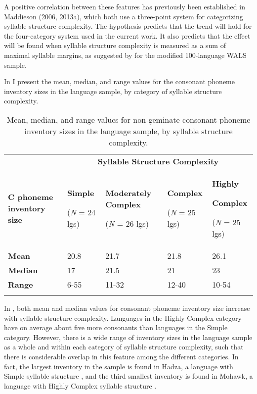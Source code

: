   A positive correlation between these features has previously been established in Maddieson (2006, 2013a), which both use a three-point system for categorizing syllable structure complexity. The hypothesis predicts that the trend will hold for the four-category system used in the current work. It also predicts that the effect will be found when syllable structure complexity is measured as a sum of maximal syllable margins, as suggested by \citet{Gordon2016} for the modified 100-language WALS sample.

  In  I present the mean, median, and range values for the consonant phoneme inventory sizes in the language sample, by category of syllable structure complexity. 

\begin{table}
\begin{tabularx}{\textwidth}{XXXXX}
 & \multicolumn{4}{c}{ \textbf{Syllable Structure Complexity}}\\
\lsptoprule
\textbf{C phoneme inventory size} & { \textbf{Simple}}

 (\textit{N} = 24 lgs) & { \textbf{Moderately Complex}}

 (\textit{N} = 26 lgs) & { \textbf{Complex}}

 (\textit{N} = 25 lgs) & { \textbf{Highly} }

{ \textbf{Complex}}

 (\textit{N} = 25 lgs)\\
\textbf{Mean} & 20.8 & 21.7 & 21.8 & 26.1\\
\textbf{Median} & 17 & 21.5 & 21 & 23\\
\textbf{Range} & 6-55 & 11-32 & 12-40 & 10-54\\
\lspbottomrule
\end{tabularx}
\caption{\label{tab:4.9}Mean, median, and range values for non-geminate consonant phoneme inventory sizes in the language sample, by syllable structure complexity.}
\end{table}

  In , both mean and median values for consonant phoneme inventory size increase with syllable structure complexity. Languages in the Highly Complex category have on average about five more consonants than languages in the Simple category. However, there is a wide range of inventory sizes in the language sample as a whole and within each category of syllable structure complexity, such that there is considerable overlap in this feature among the different categories. In fact, the largest inventory in the sample is found in Hadza, a language with Simple syllable structure , and the third smallest inventory is found in Mohawk, a language with Highly Complex syllable structure .

